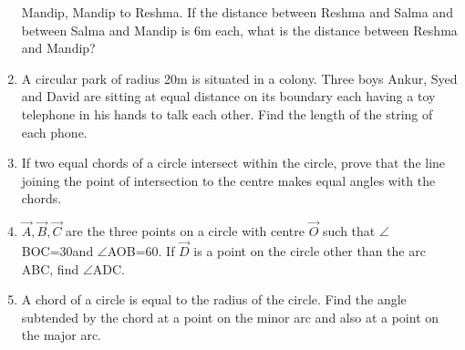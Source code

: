 \begin{enumerate}[label=\thesection.\arabic*,ref=\thesection.\theenumi]
Mandip, Mandip to Reshma. If the distance between Reshma and Salma and between 
Salma and Mandip is 6m each, what is the distance between Reshma and Mandip?
\\
\solution 

\item A circular park of radius 20m is situated in a colony. Three boys Ankur,
Syed and David are sitting at equal distance on its boundary each having a toy 
telephone in his hands to talk each other. Find the length of the string of each 
phone.
\item If two equal chords of a circle intersect within the circle, prove 
that the line joining the point of intersection to the centre makes equal 
angles with the chords.
\label{chapters/9/10/4/6}
\\
\solution 
%

\item  $\vec{A},\vec{B},\vec{C}$ are the three points on a circle with centre $\vec{O}$ such that $\angle$BOC=30\degree and $\angle$AOB=60\degree. If $\vec{D}$ is a point on the circle other than the arc ABC, find $\angle$ADC.
\label{chapters/9/10/5/1}
\\
\solution

\item A chord of a circle is equal to the radius of the circle. Find the angle subtended by the chord at a point on the minor arc and also at a point on the major arc.
\label{chapters/9/10/5/2}
\\
\solution



\end{enumerate}

